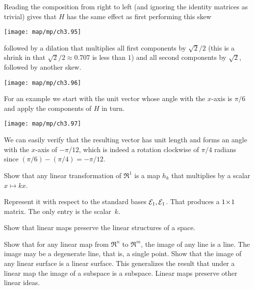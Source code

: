 \begin{exercises}
\begin{answer}
\begin{exparts}
        \partsitem Reading the composition from right to left (and ignoring the
          identity matrices as trivial) gives that $H$ has the same
          effect as first performing this skew 
          \begin{center}
            \texttt{[image: map/mp/ch3.95]}
         \end{center}
         followed by a dilation that multiplies all first components by 
         $\sqrt{2}/2$ (this is a shrink in that $\sqrt{2}/2\approx0.707$ 
         is less than $1$) 
         and all second components by $\sqrt{2}$,
         followed by another skew. 
          \begin{center}
            \texttt{[image: map/mp/ch3.96]}
         \end{center}
         For an example we start with the unit vector whose angle with
         the $x$-axis is $\pi/6$ and apply the components of $H$ in turn.
          \begin{center}
            \texttt{[image: map/mp/ch3.97]}
         \end{center}
         We can easily verify that the resulting vector has unit length 
         and forms an angle with the $x$-axis of $-\pi/12$, which is indeed
         a rotation clockwise of $\pi/4$ radians 
         since $(\pi/6)-(\pi/4)=-\pi/12$. 
      \end{exparts}
    \end{answer}
  \item \label{exer:RToRIsScalMult} 
    Show that any linear transformation of $\Re^1$ is a map $h_k$
    that multiplies by a scalar $x\mapsto kx$.
    \begin{answer}
      Represent it with respect to the 
      standard bases ${\cal E}_1,{\cal E}_1$. 
      That produces a $1 \! \times \! 1$ matrix.
      The only entry is the scalar~$k$.
    \end{answer}
  \item \label{exer:ImageLinSurIsLinSur} 
    Show that linear maps preserve the linear structures of a space.
    \begin{exparts}
      \partsitem Show that for any linear map from $\Re^n$ to $\Re^m$,
         the image of any line is a line.
         The image may be a degenerate line, that is, a single point.
      \partsitem Show that the image of any linear surface is a linear surface.
         This generalizes the result that under a linear map the image of
         a subspace is a subspace.
      \partsitem Linear maps preserve other linear ideas.

\end{exparts}
\end{exercises}
